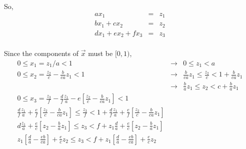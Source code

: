 \documentclass[11pt]{article}
\begin{document}
So, 
\begin{eqnarray*}
ax_1&=&z_1\\
bx_1+cx_2&=&z_2\\
dx_1+ex_2+fx_3&=&z_3\\
\end{eqnarray*}

Since the components of $\vec x$ must be $[0,1)$,
\begin{eqnarray*}
0\leq x_1=z_1/a <
1&\rightarrow& \boxed{0\leq z_1<a}\\
0\leq x_2=\frac{z_2}{c}-\frac{b}{ca}z_1<1&\rightarrow&
\frac{b}{ca}z_1\leq \frac{z_2}{c} < 1+\frac{b}{ca}z_1\\ &\rightarrow&
\boxed{\frac{b}{a}z_1\leq z_2 < c+\frac{b}{a}z_1} \\
0\leq x_3 =
\frac{z_3}{f}-\frac{d}{f}\frac{z_1}{a}-e[\frac{z_2}{c}-\frac{b}{ca}z_1]<1&&\\
\frac{d}{f}\frac{z_1}{a}+\frac{e}{f}[\frac{z_2}{c}-\frac{b}{ca}z_1]\leq
\frac{z_3}{f}<
1+\frac{d}{f}\frac{z_1}{a}+\frac{e}{f}[\frac{z_2}{c}-\frac{b}{ca}z_1]&&\\
d\frac{z_1}{a}+\frac{e}{c}[z_2-\frac{b}{a}z_1]\leq
z_3<
f+z_1\frac{d}{a}+\frac{e}{c}[z_2-\frac{b}{a}z_1]&&\\
%
\boxed{z_1[\frac{d}{a}-\frac{eb}{ca}]+\frac{e}{c}z_2\leq
z_3<
f+z_1[\frac{d}{a}-\frac{eb}{ca}]+\frac{e}{c}z_2}&&\\
\end{eqnarray*}
\end{document}
